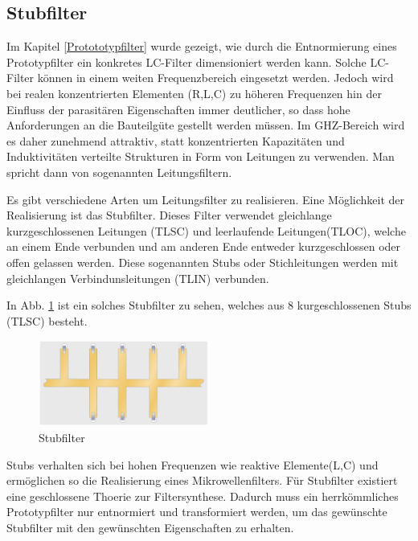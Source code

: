 \subsection{Stubfilter}

Im Kapitel \ref{Protototypfilter} wurde gezeigt, wie durch die Entnormierung eines Prototypfilter ein konkretes LC-Filter dimensioniert werden kann. Solche LC-Filter  können in einem weiten Frequenzbereich  eingesetzt  werden.  Jedoch
wird  bei realen konzentrierten Elementen (R,L,C) zu höheren Frequenzen hin der Einfluss der parasitären Eigenschaften immer deutlicher, so dass hohe Anforderungen an die Bauteilgüte  gestellt  werden  müssen. Im GHZ-Bereich wird es daher  zunehmend attraktiv,  statt  konzentrierten  Kapazitäten  und  Induktivitäten  verteilte
Strukturen  in  Form  von  Leitungen  zu  verwenden.  Man  spricht   dann  von sogenannten Leitungsfiltern.

Es gibt verschiedene Arten um  Leitungsfilter zu realisieren. Eine Möglichkeit der  Realisierung  ist das Stubfilter.  Dieses  Filter  verwendet  gleichlange kurzgeschlossenen Leitungen (TLSC) und  leerlaufende  Leitungen(TLOC), welche an einem Ende verbunden und am anderen Ende entweder kurzgeschlossen
oder offen gelassen werden. Diese sogenannten Stubs oder Stichleitungen werden mit gleichlangen Verbindunsleitungen (TLIN) verbunden. 

In Abb. \ref{fig:Stubfilter} ist ein solches Stubfilter zu sehen, welches aus 8 kurgeschlossenen Stubs (TLSC) besteht.

\begin{figure}[h!]
\centering
 	\includegraphics[width=0.5\textwidth]{Stripline_Stub_Filter.png}
 	\caption{Stubfilter}
 	\label{fig:Stubfilter}
\end{figure}


Stubs verhalten sich bei  hohen  Frequenzen  wie  reaktive Elemente(L,C) und ermöglichen so die Realisierung  eines  Mikrowellenfilters. Für Stubfilter existiert eine geschlossene Thoerie zur Filtersynthese. Dadurch muss ein herrkömmliches Prototypfilter nur entnormiert und transformiert werden, um das gewünschte Stubfilter mit den gewünschten Eigenschaften zu erhalten.

